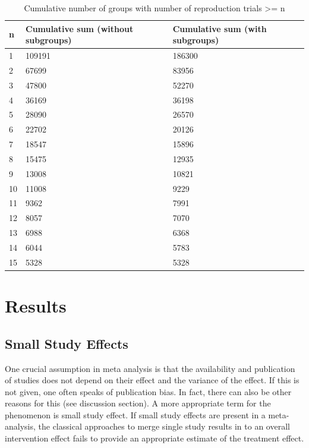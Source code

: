\documentclass[11pt,a4paper,twoside]{book}\usepackage[]{graphicx}\usepackage[]{color}
\begin{document}
\begin{table}[ht]
\centering
\begingroup\footnotesize
\begin{tabular}{lll}
  \hline
n & Cumulative sum (without subgroups) & Cumulative sum (with subgroups) \\ 
  \hline
1 & 109191 & 186300 \\ 
  2 & 67699 & 83956 \\ 
  3 & 47800 & 52270 \\ 
  4 & 36169 & 36198 \\ 
  5 & 28090 & 26570 \\ 
  6 & 22702 & 20126 \\ 
  7 & 18547 & 15896 \\ 
  8 & 15475 & 12935 \\ 
  9 & 13008 & 10821 \\ 
  10 & 11008 & 9229 \\ 
  11 & 9362 & 7991 \\ 
  12 & 8057 & 7070 \\ 
  13 & 6988 & 6368 \\ 
  14 & 6044 & 5783 \\ 
  15 & 5328 & 5328 \\ 
   \hline
\end{tabular}
\endgroup
\caption{Cumulative number of groups with number of reproduction trials >= n} 
\label{repr.groups}
\end{table}

















\chapter{Results}

\section{Small Study Effects}
One crucial assumption in meta analysis is that the availability and publication of studies does not depend on their effect and the variance of the effect. If this is not given, one often speaks of publication bias. In fact, there can also be other reasons for this (see discussion section). A more appropriate term for the phenomenon is small study effect. If small study effects are present in a meta-analysis, the classical approaches to merge single study results in to an overall intervention effect fails to provide an appropriate estimate of the treatment effect. 
\end{document}
